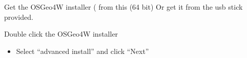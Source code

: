 \documentclass[letterpaper,10pt,english]{sphinxmanual}
\begin{document}
\begin{DUlineblock}{0em}
\item[] Get the OSGeo4W installer (
from this  (64 bit)
Or get it from the usb stick provided.
\end{DUlineblock}

\begin{DUlineblock}{0em}
\item[] 
\end{DUlineblock}

\begin{DUlineblock}{0em}
\item[] Double click the OSGeo4W installer
\end{DUlineblock}
\begin{itemize}
\item {} 
Select “advanced install” and click “Next”

\end{itemize}
\end{document}
